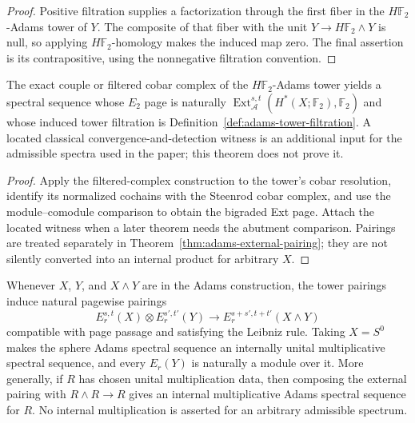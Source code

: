 \begin{proof}
  Positive filtration supplies a factorization through the first fiber in the
  $H\mathbb F_2$-Adams tower of $Y$.  The composite of that fiber with the
  unit $Y\to H\mathbb F_2\wedge Y$ is null, so applying
  $H\mathbb F_2$-homology makes the induced map zero.  The final assertion is
  its contrapositive, using the nonnegative filtration convention.
\end{proof}

\begin{theorem}
  \label{thm:adams-tower-ext-comparison}
  \notready
  The exact couple or filtered cobar complex of the
  $H\mathbb F_2$-Adams tower yields a spectral sequence whose $E_2$ page is
  naturally
  $\operatorname{Ext}_{\mathcal A}^{s,t}
  (H^*(X;\mathbb F_2),\mathbb F_2)$ and whose induced tower filtration is
  Definition~\ref{def:adams-tower-filtration}.  A located classical
  convergence-and-detection witness is an additional input for the admissible
  spectra used in the paper; this theorem does not prove it.
\end{theorem}

\begin{proof}
  Apply the filtered-complex construction to the tower's cobar resolution,
  identify its normalized cochains with the Steenrod cobar complex, and use
  the module--comodule comparison to obtain the bigraded Ext page.  Attach the
  located witness when a later theorem needs the abutment comparison.  Pairings
  are treated separately in Theorem~\ref{thm:adams-external-pairing}; they are
  not silently converted into an internal product for arbitrary $X$.
\end{proof}

\begin{theorem}
  \label{thm:adams-external-pairing}
  \notready
  Whenever $X$, $Y$, and $X\wedge Y$ are in the Adams construction, the tower
  pairings induce natural pagewise pairings
  \[
    E_r^{s,t}(X)\otimes E_r^{s',t'}(Y)
      \longrightarrow E_r^{s+s',t+t'}(X\wedge Y)
  \]
  compatible with page passage and satisfying the Leibniz rule.  Taking
  $X=S^0$ makes the sphere Adams spectral sequence an internally unital
  multiplicative spectral sequence, and every $E_r(Y)$ is naturally a module
  over it.  More generally, if $R$ has chosen unital multiplication data, then
  composing the external pairing with $R\wedge R\to R$ gives an internal
  multiplicative Adams spectral sequence for $R$.  No internal multiplication
  is asserted for an arbitrary admissible spectrum.
\end{theorem}

